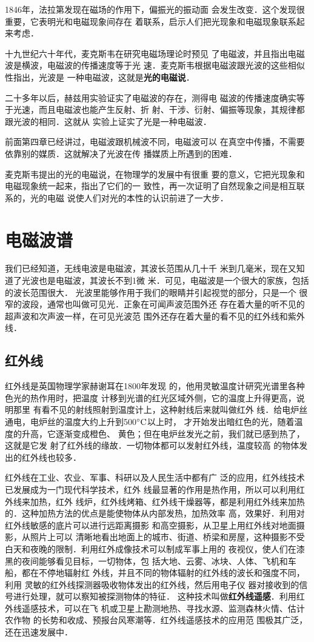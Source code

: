 1846年，法拉第发现在磁场的作用下，偏振光的振动面
会发生改变．这个发现很重要，它表明光和电磁现象间存在
着联系，启示人们把光现象和电磁现象联系起来考虑．

十九世纪六十年代，麦克斯韦在研究电磁场理论时预见
了电磁波，并且指出电磁波是横波，电磁波的传播速度等于光
速．麦克斯韦根据电磁波跟光波的这些相似性指出，光波是
一种电磁波，这就是\textbf{光的电磁说}．

二十多年以后，赫兹用实验证实了电磁波的存在，测得电
磁波的传播速度确实等于光速，而且电磁波也能产生反射、折
射、干涉、衍射、偏振等现象，其规律都跟光波的相同．这就从
实验上证实了光是一种电磁波．

前面第四章已经讲过，电磁波跟机械波不同，电磁波可以
在真空中传播，不需要依靠别的媒质．这就解决了光波在传
播媒质上所遇到的困难．

麦克斯韦提出的光的电磁说，在物理学的发展中有很重
要的意义，它把光现象和电磁现象统一起来，指出了它们的一
致性，再一次证明了自然现象之间是相互联系的，光的电磁
说使人们对光的本性的认识前进了一大步．

\section{电磁波谱}
我们已经知道，无线电波是电磁波，其波长范围从几十千
米到几毫米，现在又知道了光波也是电磁波，其波长不到1微
米．可见，电磁波是一个很大的家族，包括的波长范围很大．
光波里能够作用于我们的眼睛并引起视觉的部分，只是一个
很窄的波段，通常也叫做可见光．正象在可闻声波范围外还
存在着大量的听不见的超声波和次声波一样，在可见光波范
围外还存在着大量的看不见的红外线和紫外线．

\subsection{红外线}

红外线是英国物理学家赫谢耳在1800年发现
的，他用灵敏温度计研究光谱里各种色光的热作用时，把温度
计移到光谱的红光区域外侧，它的温度上升得更高，说明那里
有看不见的射线照射到温度计上，这种射线后来就叫做红外
线．给电炉丝通电，电炉丝的温度大约上升到500$^{\circ}{\rm C}$以上时，
才开始发出暗红色的光，随着温度的升高，它逐渐变成橙色、
黄色；但在电炉丝发光之前，我们就已感到热了，这就是它发
射了红外线的缘故．一切物体都可以发射红外线，温度较高
的物体发出的红外线也较多．

红外线在工业、农业、军事、科研以及人民生活中都有广
泛的应用，红外线技术已发展成为一门现代科学技术，红外
线最显著的作用是热作用，所以可以利用红外线来加热，红外
线炉，红外线烤箱、红外线干燥器等，都是利用红外线来加热
的．这种加热方法的优点是能使物体从内部发热，加热效率
高，效果好．利用对红外线敏感的底片可以进行远距离摄影
和高空摄影，从卫星上用红外线对地面摄影，从照片上可以
清晰地看出地面上的城市、街道、桥梁和房屋，这种摄影不受
白天和夜晚的限制．利用红外成像技术可以制成军事上用的
夜视仪，使人们在漆黑的夜间能够看见目标，一切物体，包
括大地、云雾、冰块、人体、飞机和车船，都在不停地辐射红
外线，并且不同的物体辐射的红外线的波长和强度不同，利用
灵敏的红外线探测器吸收物体发出的红外线，然后用电子仪
器对接收到的信号进行处理，就可以察知被探测物体的特征．
这种技术叫做\textbf{红外线遥感}．利用红外线遥感技术，可以在飞
机或卫星上勘测地热、寻找水源、监测森林火情、估计农作物
的长势和收成、预报台风寒潮等．红外线遥感技术的应用范
围极其广泛，还在迅速发展中．

